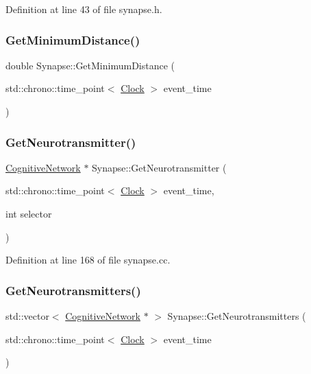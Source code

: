 Definition at line 43 of file synapse.\+h.

\mbox{\label{class_synapse_a9c59a28a562e1f3f964b0196af21d00f}} 
\subsubsection{\texorpdfstring{Get\+Minimum\+Distance()}{GetMinimumDistance()}}
{\footnotesize\ttfamily double Synapse\+::\+Get\+Minimum\+Distance (\begin{DoxyParamCaption}\item[{std\+::chrono\+::time\+\_\+point$<$ \mbox{\hyperlink{universe_8h_a0ef8d951d1ca5ab3cfaf7ab4c7a6fd80}{Clock}} $>$}]{event\+\_\+time }\end{DoxyParamCaption})}

\mbox{\label{class_synapse_aee76302a55cb0728497caa7a9f5ddeb5}} 
\subsubsection{\texorpdfstring{Get\+Neurotransmitter()}{GetNeurotransmitter()}}
{\footnotesize\ttfamily \mbox{\hyperlink{class_cognitive_network}{Cognitive\+Network}} $\ast$ Synapse\+::\+Get\+Neurotransmitter (\begin{DoxyParamCaption}\item[{std\+::chrono\+::time\+\_\+point$<$ \mbox{\hyperlink{universe_8h_a0ef8d951d1ca5ab3cfaf7ab4c7a6fd80}{Clock}} $>$}]{event\+\_\+time,  }\item[{int}]{selector }\end{DoxyParamCaption})}



Definition at line 168 of file synapse.\+cc.

\mbox{\label{class_synapse_a16d2d8025a2955be987731990309316a}} 
\subsubsection{\texorpdfstring{Get\+Neurotransmitters()}{GetNeurotransmitters()}}
{\footnotesize\ttfamily std\+::vector$<$ \mbox{\hyperlink{class_cognitive_network}{Cognitive\+Network}} $\ast$ $>$ Synapse\+::\+Get\+Neurotransmitters (\begin{DoxyParamCaption}\item[{std\+::chrono\+::time\+\_\+point$<$ \mbox{\hyperlink{universe_8h_a0ef8d951d1ca5ab3cfaf7ab4c7a6fd80}{Clock}} $>$}]{event\+\_\+time }\end{DoxyParamCaption})}



